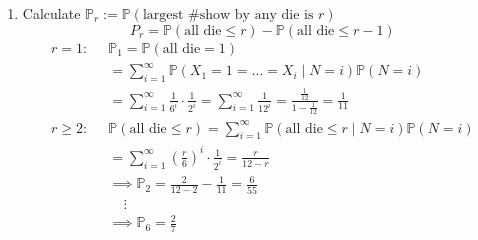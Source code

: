 \documentclass[a4paper]{article}
\newcommand{\Prob}{\mathbb{P}}
\renewcommand{\P}{\Prob}
\begin{document}
{\begin{enumerate}
\begin{align*}
        &=\frac{144}{181}
    \end{align*}
    \item Calculate $\P_r:=\P(\text{largest \# show by any die is } r)$
        \[P_r=\P(\text{all die}\leq r)-\P(\text{all die}\leq r-1)\]
        \begin{align*}
            r=1:\;\;&\P_1=\P(\text{all die}=1) \\
            &=\sum^\infty_{i=1}\P(X_1=1=\dots=X_i\mid N=i)\P(N=i) \\
            &=\sum^\infty_{i=1}\frac{1}{6^i}\cdot\frac{1}{2^i}
            =\sum^\infty_{i=1}\frac{1}{12^i} 
            =\frac{\frac{1}{12}}{1-\frac{1}{12}} 
            =\frac{1}{11} \\
            r\geq2:\;\;&\P(\text{all die}\leq r)=\sum^\infty_{i=1}\P(\text{all die}\leq r\mid N=i)\P(N=i) \\ %
            &=\sum^\infty_{i=1}(\frac{r}{6})^i\cdot\frac{1}{2^i}=\frac{r}{12-r} \\
            &\implies\P_2=\frac{2}{12-2}-\frac{1}{11}=\frac{6}{55} \\
            &\;\;\;\;\vdots \\
            &\implies\P_6=\frac{2}{7}
        \end{align*}
        
\end{enumerate}
}
\end{document}
